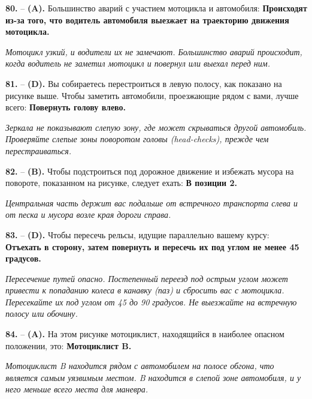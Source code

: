 \begin{minipage}{\linewidth}
\noindent\textbf{80.}  -- \textbf {(A).} Большинство аварий с участием мотоцикла и автомобиля:  \textbf {Происходят из-за того, что водитель автомобиля выезжает на траекторию движения мотоцикла.} \par \textit {Мотоцикл узкий, и водители их не замечают. Большинство аварий происходит, когда водитель не заметил мотоцикл и повернул или выехал перед ним.} \\
\end{minipage}

\begin{minipage}{\linewidth}
\noindent\textbf{81.}  -- \textbf {(D).} Вы собираетесь перестроиться в левую полосу, как показано на рисунке выше. Чтобы заметить автомобили, проезжающие рядом с вами, лучше всего:  \textbf {Повернуть голову влево.} \par \textit {Зеркала не показывают слепую зону, где может скрываться другой автомобиль. Проверяйте слепые зоны поворотом головы (head-checks), прежде чем перестраиваться.} \\
\end{minipage}

\begin{minipage}{\linewidth}
\noindent\textbf{82.}  -- \textbf {(B).} Чтобы подстроиться под дорожное движение и избежать мусора на повороте, показанном на рисунке, следует ехать:  \textbf {В позиции 2.} \par \textit {Центральная часть держит вас подальше от встречного транспорта слева и от песка и мусора возле края дороги справа.} \\
\end{minipage}

\begin{minipage}{\linewidth}
\noindent\textbf{83.}  -- \textbf {(D).} Чтобы пересечь рельсы, идущие параллельно вашему курсу:  \textbf {Отъехать в сторону, затем повернуть и пересечь их под углом не менее 45 градусов.} \par \textit {Пересечение путей опасно. Постепенный переезд под острым углом может привести к попаданию колеса в канавку (паз) и сбросить вас с мотоцикла. Пересекайте их под углом от 45 до 90 градусов. Не выезжайте на встречную полосу или обочину.} \\
\end{minipage}

\begin{minipage}{\linewidth}
\noindent\textbf{84.}  -- \textbf {(A).} На этом рисунке мотоциклист, находящийся в наиболее опасном положении, это:  \textbf {Мотоциклист B.} \par \textit {Мотоциклист B находится рядом с автомобилем на полосе обгона, что является самым уязвимым местом. B находится в слепой зоне автомобиля, и у него меньше всего места для маневра.} \\
\end{minipage}

